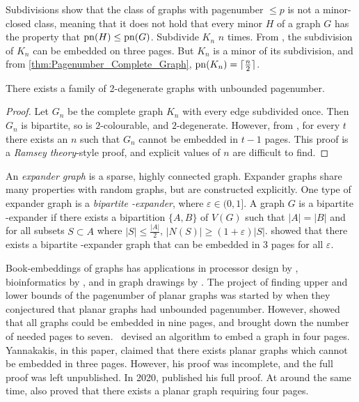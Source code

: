 Subdivisions show that the class of graphs with pagenumber $\leq p$ is not a minor-closed class, meaning that it does not hold that every minor $H$ of a graph $G$ has the property that $\operatorname{pn}(H) \leq \operatorname{pn}(G)$. 
Subdivide $K_n$ $n$ times. From \textcite{atneosenEmbeddabilityCompactaNbooks}, the subdivision of $K_n$ can be embedded on three pages. But $K_n$ is a minor of its subdivision, and from \cref{thm:Pagenumber_Complete_Graph}, $\operatorname{pn}(K_n) = \lceil \frac{n}{2} \rceil$. 

\begin{theorem}
	There exists a family of 2-degenerate graphs with unbounded pagenumber.
\end{theorem}
\begin{proof}
	Let $G_n$ be the complete graph $K_n$ with every edge subdivided once. Then $G_n$ is bipartite, so is $2$-colourable, and $2$-degenerate. However, from \textcite{eppsteinSeparatingThicknessGeometric2002}, for every $t$ there exists an $n$ such that $G_n$ cannot be embedded in $t-1$ pages. This proof is a \textit{Ramsey theory}-style proof, and explicit values of $n$ are difficult to find. 
\end{proof}

An \textit{expander graph} is a sparse, highly connected graph. Expander graphs share many properties with random graphs, but are constructed explicitly. One type of expander graph is a \textit{bipartite \varepsilon-expander}, where $\varepsilon \in (0, 1]$. A graph $G$ is a bipartite \varepsilon-expander if there exists a bipartition $ \{A, B\}$ of $V(G)$ such that $|A| = |B|$ and for all subsets $S \subset A$ where $|S| \leq \frac{|A|}{2}$, $|N(S)| \geq (1 + \varepsilon) |S|$. 
\textcite{dujmovicLayoutsExpanderGraphs2016} showed that there exists a bipartite \varepsilon-expander graph that can be embedded in 3 pages for all $\varepsilon$. 


Book-embeddings of graphs has applications in processor design by \textcite{chungEmbeddingGraphsBooks1987}, bioinformatics by \textcite{haslingerRNAStructuresPseudoknots1999}, and in graph drawings by \textcite{woodBoundedDegreeBook2002}. 
The project of finding upper and lower bounds of the pagenumber of planar graphs was started by \textcite{bernhartBookThicknessGraph1979} when they conjectured that planar graphs had unbounded pagenumber. However, \textcite{bussPagenumberPlanarGraphs1984} showed that all graphs could be embedded in nine pages, and \textcite{heathEmbeddingPlanarGraphs1984} brought down the number of needed pages to seven.\ \textcite{yannakakisEmbeddingPlanarGraphs1989} devised an algorithm to embed a graph in four pages. Yannakakis, in this paper, claimed that there exists planar graphs which cannot be embedded in three pages. However, his proof was incomplete, and the full proof was left unpublished. In 2020, \textcite{yannakakisPlanarGraphsThat2020} published his full proof. At around the same time, \textcite{kaufmannFourPagesAre2020} also proved that there exists a planar graph requiring four pages.


